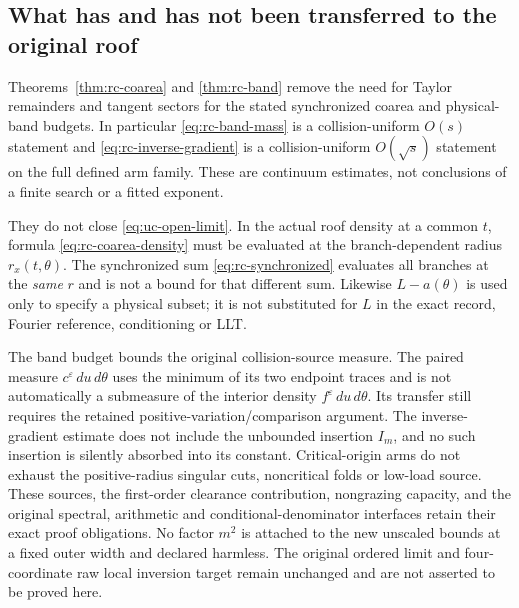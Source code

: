 \subsection{What has and has not been transferred to the original roof}
Theorems~\ref{thm:rc-coarea} and \ref{thm:rc-band} remove the need
for Taylor remainders and tangent sectors for the stated synchronized
coarea and physical-band budgets. In particular
\eqref{eq:rc-band-mass} is a collision-uniform $O(s)$ statement and
\eqref{eq:rc-inverse-gradient} is a collision-uniform $O(\sqrt s)$
statement on the full defined arm family. These are continuum estimates,
not conclusions of a finite search or a fitted exponent.

They do not close \eqref{eq:uc-open-limit}. In the actual roof density
at a common $t$, formula \eqref{eq:rc-coarea-density} must be evaluated
at the branch-dependent radius $r_x(t,\theta)$. The synchronized sum
\eqref{eq:rc-synchronized} evaluates all branches at the \emph{same}
$r$ and is not a bound for that different sum. Likewise $L-a(\theta)$
is used only to specify a physical subset; it is not substituted for
$L$ in the exact record, Fourier reference, conditioning or LLT.

The band budget bounds the original collision-source measure. The
paired measure $c^\varepsilon\,du\,d\theta$ uses the minimum of its
two endpoint traces and is not automatically a submeasure of the
interior density $f^\varepsilon\,du\,d\theta$. Its transfer still
requires the retained positive-variation/comparison argument. The
inverse-gradient estimate does not include the unbounded insertion
$I_m$, and no such insertion is silently absorbed into its constant.
Critical-origin arms do not exhaust the positive-radius singular cuts,
noncritical folds or low-load source. These sources, the first-order
clearance contribution, nongrazing capacity, and the original spectral,
arithmetic and conditional-denominator interfaces retain their exact
proof obligations. No factor $m^2$ is attached to the new unscaled
bounds at a fixed outer width and declared harmless. The original
ordered limit and four-coordinate raw local inversion target remain
unchanged and are not asserted to be proved here.
